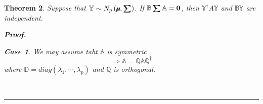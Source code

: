 \documentclass{article}
\newtheorem{theorem}{Theorem}
\newtheorem{case}[theorem]{Case}
\newenvironment{proof}[1][Proof]{\noindent\textbf{#1.} }{\ \rule{0.5em}{0.5em}}
\begin{document}
\begin{theorem}
Suppose that $\mathbb{Y}\sim N_{p}\left( \mathbb{%
\mu\mkern-12.3mu\mu%
},\mathbb{%
\tsum\mkern-20mu\tsum%
}\right) $. If $\mathbb{B}%
\tsum\mkern-20mu\tsum%
\mathbb{A}=\boldsymbol{0}$, then $\mathbb{Y}^{\dagger }A\mathbb{Y}$ and $%
\mathbb{BY}$ are independent.

\begin{proof}

\begin{case}
We may assume taht $\mathbb{A}$ is symmetric%
\begin{equation*}
\Rightarrow \mathbb{A}=\mathbb{QAQ}^{\dagger }
\end{equation*}%
where $\mathbb{D}=diag\left( \lambda _{1},\cdots ,\lambda _{p}\right) $ and $%
\mathbb{Q}$ is orthogonal.
\end{case}
\end{proof}
\end{theorem}
\end{document}
